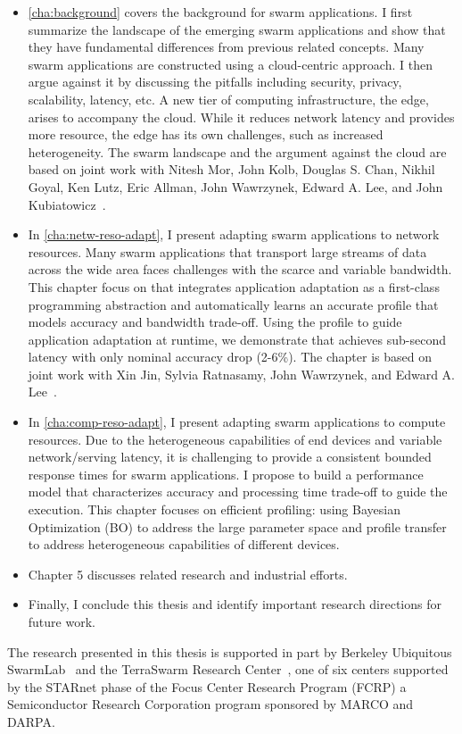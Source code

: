 \documentclass[thesis.tex]{subfiles}
\begin{document}
\begin{itemize}[topsep=5pt]
\item \autoref{cha:background} covers the background for swarm applications. I
  first summarize the landscape of the emerging swarm applications and show that
  they have fundamental differences from previous related concepts.  Many swarm
  applications are constructed using a cloud-centric approach. I then argue
  against it by discussing the pitfalls including security, privacy,
  scalability, latency, etc. A new tier of computing infrastructure, the edge,
  arises to accompany the cloud. While it reduces network latency and provides
  more resource, the edge has its own challenges, such as increased
  heterogeneity. The swarm landscape and the argument against the cloud are
  based on joint work with Nitesh Mor, John Kolb, Douglas S. Chan, Nikhil Goyal,
  Ken Lutz, Eric Allman, John Wawrzynek, Edward A. Lee, and John
  Kubiatowicz~\cite{zhang2015cloud}.
\item In \autoref{cha:netw-reso-adapt}, I present adapting swarm applications to
  network resources. Many swarm applications that transport large streams of
  data across the wide area faces challenges with the scarce and variable
  bandwidth. This chapter focus on \awstream{} that integrates application
  adaptation as a first-class programming abstraction and automatically learns
  an accurate profile that models accuracy and bandwidth trade-off. Using the
  profile to guide application adaptation at runtime, we demonstrate that
  \awstream{} achieves sub-second latency with only nominal accuracy drop
  (2-6\%).  The chapter is based on joint work with Xin Jin, Sylvia Ratnasamy,
  John Wawrzynek, and Edward A. Lee~\cite{zhang2018awstream}.
\item In \autoref{cha:comp-reso-adapt}, I present adapting swarm applications to
  compute resources. Due to the heterogeneous capabilities of end devices and
  variable network/serving latency, it is challenging to provide a consistent
  bounded response times for swarm applications. I propose to build a
  performance model that characterizes accuracy and processing time trade-off to
  guide the execution. This chapter focuses on efficient profiling: using
  Bayesian Optimization (BO) to address the large parameter space and profile
  transfer to address heterogeneous capabilities of different devices.
\item Chapter 5 discusses related research and industrial efforts.
\item Finally, I conclude this thesis and identify important research directions
  for future work.
\end{itemize}

The research presented in this thesis is supported in part by Berkeley
Ubiquitous SwarmLab~\cite{swarmlab} and the TerraSwarm Research
Center~\cite{terraswarm}, one of six centers supported by the STARnet phase of
the Focus Center Research Program (FCRP) a Semiconductor Research Corporation
program sponsored by MARCO and DARPA.
\end{document}

